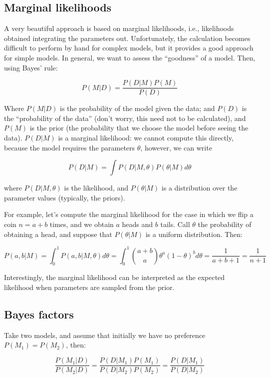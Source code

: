 \documentclass[
  letterpaper,
  DIV=11,
  numbers=noendperiod]{scrreprt}
\begin{document}
\subsection{Marginal likelihoods}\label{marginal-likelihoods}

A very beautiful approach is based on marginal likelihoods, i.e.,
likelihoods obtained integrating the parameters out. Unfortunately, the
calculation becomes difficult to perform by hand for complex models, but
it provides a good approach for simple models. In general, we want to
assess the ``goodness'' of a model. Then, using Bayes' rule:

\[
  P(M\vert D) = \frac{P(D\vert M) P(M)}{P(D)}
\]

Where \(P(M\vert D)\) is the probability of the model given the data;
and \(P(D)\) is the ``probability of the data'' (don't worry, this need
not to be calculated), and \(P(M)\) is the prior (the probability that
we choose the model before seeing the data). \(P(D\vert M)\) is a
marginal likelihood: we cannot compute this directly, because the model
requires the parameters \(\theta\), however, we can write

\[
P(D\vert M) = \int P(D\vert M,\theta)P(\theta\vert M) d\theta
\]

where \(P(D\vert M,\theta)\) is the likelihood, and \(P(\theta\vert M)\)
is a distribution over the parameter values (typically, the priors).

For example, let's compute the marginal likelihood for the case in which
we flip a coin \(n = a + b\) times, and we obtain \(a\) heads and \(b\)
tails. Call \(\theta\) the probability of obtaining a head, and suppose
that \(P(\theta\vert M)\) is a uniform distribution. Then:

\[
P(a,b\vert M) = \int_0^1 P(a,b\vert M,\theta) d\theta = \int_0^1 \binom{a+b}{a} \theta^{a} (1-\theta)^{b} d\theta  = \frac{1}{a+b+1} = \frac{1}{n+1}
\]

Interestingly, the marginal likelihood can be interpreted as the
expected likelihood when parameters are sampled from the prior.

\subsection{Bayes factors}\label{bayes-factors}

Take two models, and assume that initially we have no preference
\(P(M_1) = P(M_2)\), then:

\[
  \frac{P(M_1\vert D)}{P(M_2\vert D)} = \frac{P(D\vert M_1)P(M_1)}{P(D\vert M_2)P(M_2)} = \frac{P(D\vert M_1)}{P(D\vert M_2)}
\]
\end{document}
